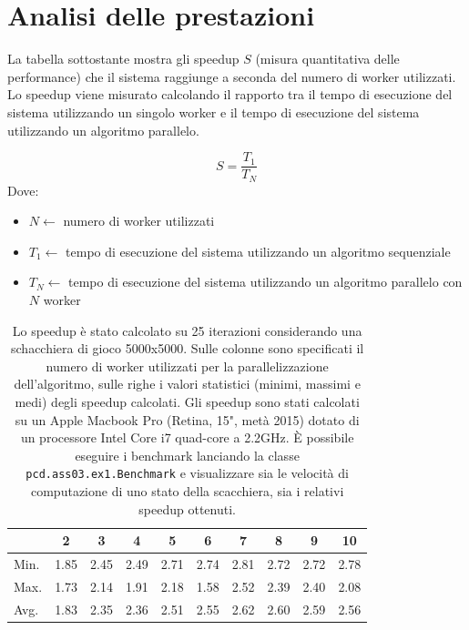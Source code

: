 \documentclass[a4paper]{report}
\begin{document}
\section{Analisi delle prestazioni}\label{analisi-delle-prestazioni-1}
La tabella sottostante mostra gli speedup $S$ (misura quantitativa delle performance) che il sistema raggiunge a seconda del numero di worker utilizzati.\\
Lo speedup viene misurato calcolando il rapporto tra il tempo di esecuzione del sistema utilizzando un singolo worker e il tempo di esecuzione del sistema utilizzando un algoritmo parallelo.

\begin{equation}
 S = \frac{T_1}{T_N}
\end{equation}
Dove:
\begin{itemize}
    \item $N \leftarrow$ numero di worker utilizzati
    \item $T_1 \leftarrow$ tempo di esecuzione del sistema utilizzando un algoritmo sequenziale
    \item $T_N \leftarrow$ tempo di esecuzione del sistema utilizzando un algoritmo parallelo con $N$ worker
\end{itemize}

\begin{table}[H]
\centering
\begin{tabular}{l|ccccccccc}
\hline
     & 2    & 3    & 4    & 5    & 6    & 7    & 8    & 9    & 10   \\ \hline
Min. & 1.85 & 2.45 & 2.49 & 2.71 & 2.74 & 2.81 & 2.72 & 2.72 & 2.78 \\
Max. & 1.73 & 2.14 & 1.91 & 2.18 & 1.58 & 2.52 & 2.39 & 2.40 & 2.08 \\
Avg. & 1.83 & 2.35 & 2.36 & 2.51 & 2.55 & 2.62 & 2.60 & 2.59 & 2.56 \\ \hline
\end{tabular}
\caption{Lo speedup è stato calcolato su 25 iterazioni considerando una schacchiera di gioco 5000x5000. Sulle colonne sono specificati il numero di worker utilizzati per la parallelizzazione dell'algoritmo, sulle righe i valori statistici (minimi, massimi e medi) degli speedup calcolati. Gli speedup sono stati calcolati su un Apple Macbook Pro (Retina, 15", metà 2015) dotato di un processore Intel Core i7 quad-core a 2.2GHz.
È possibile eseguire i benchmark lanciando la classe \texttt{pcd.ass03.ex1.Benchmark} e visualizzare sia le velocità di computazione di uno stato della scacchiera, sia i relativi speedup ottenuti.}
\label{speedup-table}
\end{table}
\end{document}
